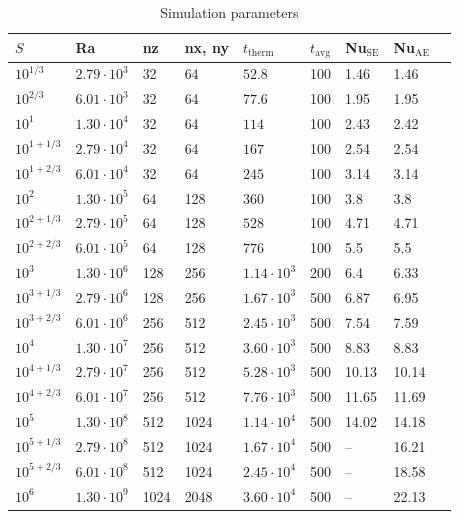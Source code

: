 \documentclass[aps, pre, onecolumn, nofootinbib, notitlepage, groupedaddress, amsfonts, amssymb, amsmath, longbibliography]{revtex4-1}
\begin{document}
\begin{table}
\caption{Simulation parameters}
\label{table:run_parameters}
\begin{center}
\begin{tabularx}{\textwidth}{ X X X X X X X X X }
\hline															
$S$	&	Ra	&	nz	&	nx, ny	&	$t_{\text{therm}}$	&	$t_{\text{avg}}$	&	Nu$_{\text{SE}}$	&	Nu$_{\text{AE}}$	\\
\hline															
$10^{1/3}$	&	$2.79 \cdot 10^3$	&	32	&	64	&	$52.8$	&	100	&	1.46	&	1.46	\\
$10^{2/3}$	&	$6.01 \cdot 10^3$	&	32	&	64	&	$77.6$	&	100	&	1.95	&	1.95	\\
$10^1$	&	$1.30 \cdot 10^4$	&	32	&	64	&	$114$	&	100	&	2.43	&	2.42	\\
$10^{1 + 1/3}$	&	$2.79 \cdot 10^4$	&	32	&	64	&	$167$	&	100	&	2.54	&	2.54	\\
$10^{1 + 2/3}$	&	$6.01 \cdot 10^4$	&	32	&	64	&	$245$	&	100	&	3.14	&	3.14	\\
$10^2$	&	$1.30 \cdot 10^5$	&	64	&	128	&	$360$	&	100	&	3.8	&	3.8	\\
$10^{2 + 1/3}$	&	$2.79 \cdot 10^5$	&	64	&	128	&	$528$	&	100	&	4.71	&	4.71	\\
$10^{2 + 2/3}$	&	$6.01 \cdot 10^5$	&	64	&	128	&	$776$	&	100	&	5.5	&	5.5	\\
$10^3$	&	$1.30 \cdot 10^6$	&	128	&	256	&	$1.14 \cdot 10^3$	&	200	&	6.4	&	6.33	\\
$10^{3 + 1/3}$	&	$2.79 \cdot 10^6$	&	128	&	256	&	$1.67 \cdot 10^3$	&	500	&	6.87	&	6.95	\\
$10^{3 + 2/3}$	&	$6.01 \cdot 10^6$	&	256	&	512	&	$2.45 \cdot 10^3$	&	500	&	7.54	&	7.59	\\
$10^4$	&	$1.30 \cdot 10^7$	&	256	&	512	&	$3.60 \cdot 10^3$	&	500	&	8.83	&	8.83	\\
$10^{4 + 1/3}$	&	$2.79 \cdot 10^7$	&	256	&	512	&	$5.28 \cdot 10^3$	&	500	&	10.13	&	10.14	\\
$10^{4 + 2/3}$	&	$6.01 \cdot 10^7$	&	256	&	512	&	$7.76 \cdot 10^3$	&	500	&	11.65	&	11.69	\\
$10^5$	&	$1.30 \cdot 10^8$	&	512	&	1024	&	$1.14 \cdot 10^4$	&	500	&	14.02	&	14.18	\\
$10^{5 + 1/3}$	&	$2.79 \cdot 10^8$	&	512	&	1024	&	$1.67 \cdot 10^4$	&	500	&	--	&	16.21	\\
$10^{5 + 2/3}$	&	$6.01 \cdot 10^8$	&	512	&	1024	&	$2.45 \cdot 10^4$	&	500	&	--	&	18.58	\\
$10^6$	&	$1.30 \cdot 10^9$	&	1024	&	2048	&	$3.60 \cdot 10^4$	&	500	&	--	&	22.13	\\

\end{tabularx}
\end{center}
\end{table}
\end{document}
